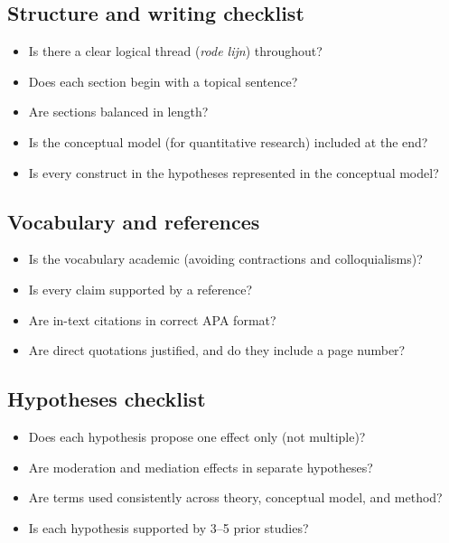 \documentclass[
  11pt,
  a4paper,
]{scrbook}
\providecommand{\tightlist}{%
  \setlength{\itemsep}{0pt}\setlength{\parskip}{0pt}}\usepackage{longtable,booktabs,array}
\begin{document}
\subsection{Structure and writing
checklist}\label{structure-and-writing-checklist}

\begin{itemize}
\tightlist
\item[$\square$]
  Is there a clear logical thread (\emph{rode lijn}) throughout?
\item[$\square$]
  Does each section begin with a topical sentence?
\item[$\square$]
  Are sections balanced in length?
\item[$\square$]
  Is the conceptual model (for quantitative research) included at the
  end?
\item[$\square$]
  Is every construct in the hypotheses represented in the conceptual
  model?
\end{itemize}

\subsection{Vocabulary and references}\label{vocabulary-and-references}

\begin{itemize}
\tightlist
\item[$\square$]
  Is the vocabulary academic (avoiding contractions and colloquialisms)?
\item[$\square$]
  Is every claim supported by a reference?
\item[$\square$]
  Are in-text citations in correct APA format?
\item[$\square$]
  Are direct quotations justified, and do they include a page number?
\end{itemize}

\subsection{Hypotheses checklist}\label{hypotheses-checklist}

\begin{itemize}
\tightlist
\item[$\square$]
  Does each hypothesis propose one effect only (not multiple)?
\item[$\square$]
  Are moderation and mediation effects in separate hypotheses?
\item[$\square$]
  Are terms used consistently across theory, conceptual model, and
  method?
\item[$\square$]
  Is each hypothesis supported by 3--5 prior studies?
\end{itemize}
\end{document}
